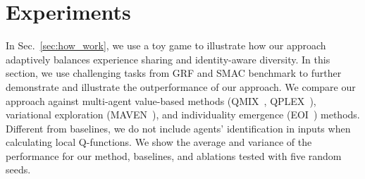 \section{Experiments}\label{experiment}


In Sec.~\ref{sec:how_work}, we use a toy game to illustrate how our approach adaptively balances experience sharing and identity-aware diversity. In this section, we use challenging tasks from GRF and SMAC benchmark to further demonstrate and illustrate the outperformance of our approach. We compare our approach against multi-agent value-based methods (QMIX~\cite{rashid2018qmix}, QPLEX~\cite{wang2020qplex}), variational exploration (MAVEN~\cite{mahajan2019maven}), and individuality emergence (EOI~\cite{jiang2020emergence}) methods. Different from baselines, we do not include agents' identification in inputs when calculating local Q-functions. We show the average and variance of the performance for our method, baselines, and ablations tested with five random seeds.

